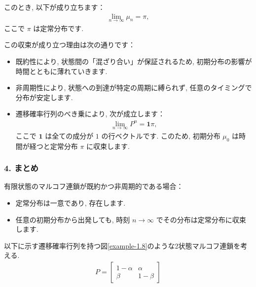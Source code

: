 \documentclass[a4j]{jsarticle}
\begin{document}
{	このとき, 以下が成り立ちます：
	\begin{align*}
		\lim_{n \to \infty} \mu_n = \pi,
	\end{align*}
	ここで $\pi$ は定常分布です.

	この収束が成り立つ理由は次の通りです：
	\begin{itemize}
		\item 既約性により, 状態間の「混ざり合い」が保証されるため, 初期分布の影響が時間とともに薄れていきます.
		\item 非周期性により, 状態への到達が特定の周期に縛られず, 任意のタイミングで分布が安定します.
		\item 遷移確率行列のべき乗により, 次が成立します：
		      \begin{align*}
			      \lim_{n \to \infty} P^n = \mathbf{1} \pi,
		      \end{align*}
		      ここで $\mathbf{1}$ は全ての成分が $1$ の行ベクトルです. このため, 初期分布 $\mu_0$ は時間が経つと定常分布 $\pi$ に収束します.
	\end{itemize}

	\subsubsection*{4. まとめ}
	有限状態のマルコフ連鎖が既約かつ非周期的である場合：
	\begin{itemize}
		\item 定常分布は一意であり, 存在します.
		\item 任意の初期分布から出発しても, 時刻 $n \to \infty$ でその分布は定常分布に収束します.
	\end{itemize}
}

 以下に示す遷移確率行列を持つ図\ref{example-1.8}のような2状態マルコフ連鎖を考える.
\begin{align}
	P = \begin{bmatrix}
		1-\alpha & \alpha  \\
		\beta    & 1-\beta
	\end{bmatrix}
\end{align}
\end{document}
